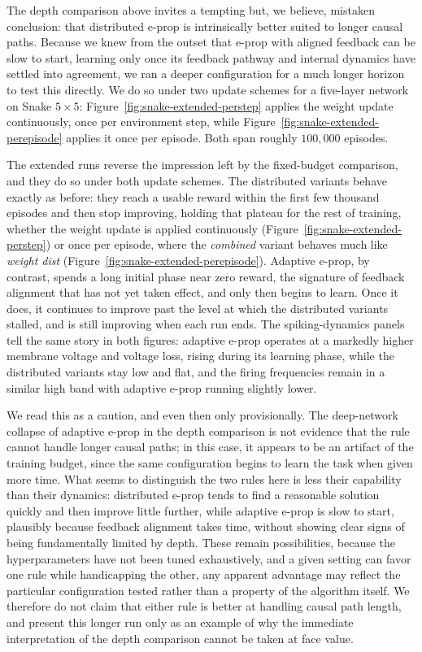 The depth comparison above invites a tempting but, we believe, mistaken conclusion: that
distributed e-prop is intrinsically better suited to longer causal paths. Because we knew from the
outset that e-prop with aligned feedback can be slow to start, learning only once its feedback
pathway and internal dynamics have settled into agreement, we ran a deeper configuration for a
much longer horizon to test this directly. We do so under two update schemes for a five-layer
network on Snake $5\times5$: Figure~\ref{fig:snake-extended-perstep} applies the weight update
continuously, once per environment step, while Figure~\ref{fig:snake-extended-perepisode} applies
it once per episode. Both span roughly $100{,}000$ episodes.

The extended runs reverse the impression left by the fixed-budget comparison, and they do so under
both update schemes. The distributed variants behave exactly as before: they reach a usable reward
within the first few thousand episodes and then stop improving, holding that plateau for the rest
of training, whether the weight update is applied continuously (Figure~\ref{fig:snake-extended-perstep})
or once per episode, where the \emph{combined} variant behaves much like \emph{weight dist}
(Figure~\ref{fig:snake-extended-perepisode}). Adaptive e-prop, by contrast, spends a long initial
phase near zero reward, the signature of feedback alignment that has not yet taken effect, and only
then begins to learn. Once it does, it continues to improve past the level at which the distributed
variants stalled, and is still improving when each run ends. The spiking-dynamics panels tell the
same story in both figures: adaptive e-prop operates at a markedly higher membrane voltage and
voltage loss, rising during its learning phase, while the distributed variants stay low and flat,
and the firing frequencies remain in a similar high band with adaptive e-prop running slightly lower.

We read this as a caution, and even then only provisionally. The
deep-network collapse of adaptive e-prop in the depth comparison is not evidence that the rule
cannot handle longer causal paths; in this case, it appears to be an artifact of the training
budget, since the same configuration begins to learn the task when given more time. What seems
to distinguish the two rules here is less their capability than their dynamics: distributed
e-prop tends to find a reasonable solution quickly and then improve little further, while
adaptive e-prop is slow to start, plausibly because feedback alignment takes time, without
showing clear signs of being fundamentally limited by depth. These remain possibilities, 
because the hyperparameters have not been tuned exhaustively, and a given
setting can favor one rule while handicapping the other, any apparent advantage may reflect the
particular configuration tested rather than a property of the algorithm itself. We therefore do
not claim that either rule is better at handling causal path length, and present this longer run
only as an example of why the immediate interpretation of the depth comparison cannot be taken
at face value.


